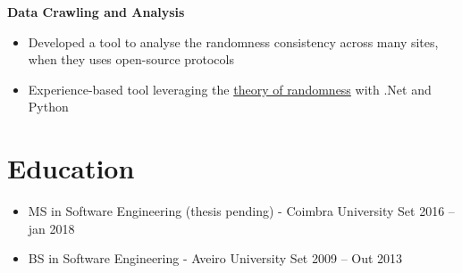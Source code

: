 \documentclass[11pt]{article}       %
\begin{document}
\textbf{Data Crawling and Analysis}
\vspace{-9pt}
\begin{itemize}
  \item Developed a tool to analyse the randomness consistency across many sites, when they uses open-source protocols
  \item Experience-based tool leveraging the \href{https://www.random.org/randomness/}{theory of randomness} with .Net and Python
\end{itemize}


\vspace{-18.5pt}

\section*{Education}
\begin{itemize}
\item MS in Software Engineering (thesis pending) - Coimbra University \hfill Set 2016 -- jan 2018 \\
\item BS in Software Engineering - Aveiro University \hfill Set 2009 -- Out 2013
\end{itemize}
\end{document}
